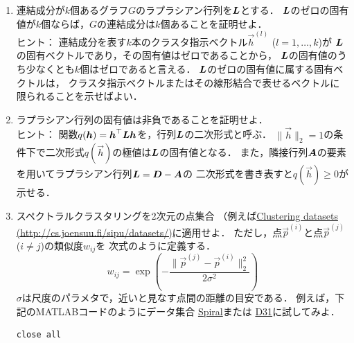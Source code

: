 \begin{enumerate}
\item
\label{ex:k indicators}
連結成分が$k$個あるグラフ$G$のラプラシアン行列を$\mbox{\boldmath $L$}$とする．
$\mbox{\boldmath $L$}$のゼロの固有値が$k$個ならば，$G$の連結成分は$k$個あることを証明せよ．\\
ヒント：
連結成分を表す$k$本のクラスタ指示ベクトル$\vec h^{(l)}$ ($l=1,\dots,k$)が
$\mbox{\boldmath $L$}$の固有ベクトルであり，その固有値はゼロであることから，
$\mbox{\boldmath $L$}$の固有値のうち少なくとも$k$個はゼロであると言える．
$\mbox{\boldmath $L$}$のゼロの固有値に属する固有ベクトルは，
クラスタ指示ベクトルまたはその線形結合で表せるベクトルに
限られることを示せばよい．
\item
\label{ex:L has nonnegative eigs}
ラプラシアン行列の固有値は非負であることを証明せよ．\\
ヒント：
関数$q(\mbox{\boldmath $h$})=\mbox{\boldmath $h$}^\top\mbox{\boldmath $L$}\mbox{\boldmath $h$}$を，行列$\mbox{\boldmath $L$}$の二次形式と呼ぶ．
$\|\vec h\|_2=1$の条件下で二次形式$q(\vec h)$の極値は$\mbox{\boldmath $L$}$の固有値となる．
また，隣接行列$\mbox{\boldmath $A$}$の要素を用いてラプラシアン行列$\mbox{\boldmath $L$}=\mbox{\boldmath $D$}-\mbox{\boldmath $A$}$の
二次形式を書き表すと$q(\vec h)\geq 0$が示せる．
\item
スペクトラルクラスタリングを2次元の点集合
（例えば\href{http://cs.joensuu.fi/sipu/datasets/}{Clustering datasets\\ (http://cs.joensuu.fi/sipu/datasets/)}に適用せよ．
ただし，点$\vec p^{(i)}$と点$\vec p^{(j)}$ ($i\neq j$)の類似度$w_{ij}$を
次式のように定義する．
\begin{equation}
 w_{ij}=\exp\left(-\frac{\| \vec p^{(j)}-\vec p^{(i)} \|_2^2}{2\sigma^2}\right)
\end{equation}
$\sigma$は尺度のパラメタで，近いと見なす点間の距離の目安である．
例えば，下記のMATLABコードのようにデータ集合
\href{http://cs.joensuu.fi/sipu/datasets/spiral.txt}{Spiral}または
\href{http://cs.joensuu.fi/sipu/datasets/D31.txt}{D31}に試してみよ．
\lstset{language=Matlab}
\lstset{tabsize=2,showstringspaces=false}
\lstset{flexiblecolumns=true}
\lstset{framesep=2ex}
\lstset{xleftmargin=4ex,xrightmargin=4ex}
\begin{lstlisting}
close all


\end{lstlisting}
\end{enumerate}
